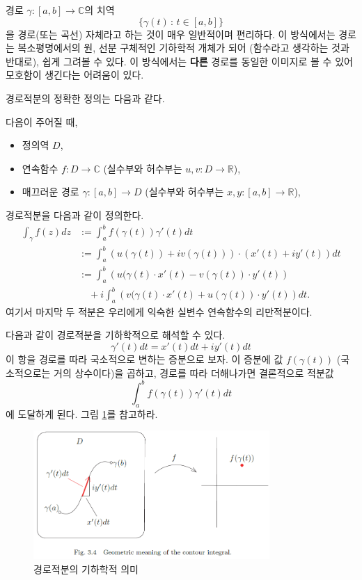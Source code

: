 \begin{salt_remark} \label{remark-3-1}
경로 $\gamma: [a,b]\to \mathbb C$의 치역
\[
\{\gamma(t) \,:\, t\in[a,b] \}
\]
을 경로(또는 곡선) 자체라고 하는 것이 매우 일반적이며 편리하다. 
이 방식에서는 경로는 
복소평명에서의 원, 선분 구체적인 기하학적 개체가 되어 (함수라고 생각하는 것과 반대로),
쉽게 그려볼 수 있다.
이 방식에서는 {\bf 다른} 경로를 동일한 이미지로 볼 수 있어
모호함이 생긴다는 어려움이 있다.
\end{salt_remark}

경로적분의 정확한 정의는 다음과 같다.

\begin{saltdefinition} {}{} \label{def-3-1}
다음이 주어질 때,
\begin{itemize}
\item[(1)] 정의역 $D$,
\item[(2)] 연속함수  $f:D\to\mathbb C$ (실수부와 허수부는 
$u,v: D\to\mathbb R$),
\item[(3)] 매끄러운 경로 $\gamma : [a,b]\to D$
(실수부와 허수부는 $x,y: [a,b] \to \mathbb R$),
\end{itemize}
경로적분을 다음과 같이 정의한다.
\begin{align} \label{eq-3-2}
\int_\gamma f(z)dz
&:= \int_a^b f(\gamma(t))\gamma'(t)dt \\
&:= \int_a^b \left( u(\gamma(t)) + iv(\gamma(t)) \right) \cdot
(x'(t) + iy'(t))dt \nonumber \\
&:= \int_a^b \left( u(\gamma(t)\cdot x'(t) - v(\gamma(t))\cdot y'(t) \right) \nonumber \\
&\quad +i \int_a^b \left(v(\gamma(t)\cdot x'(t) + u(\gamma(t))\cdot y'(t) \right) dt \nonumber.
\end{align}
여기서 마지막 두 적분은 우리에게 익숙한 실변수 연속함수의 리만적분이다.
\end{saltdefinition}

다음과 같이 경로적분을 기하학적으로 해석할 수 있다.
\[
\gamma'(t) dt = x'(t)dt + iy'(t)dt
\]
이 항을 경로를 따라 국소적으로 변하는 증분으로 보자.
이 증분에 값 $f(\gamma(t))$ (국소적으로는 거의 상수이다)을 곱하고,
경로를 따라 더해나가면 결론적으로 적분값
\[
\int_a^b f(\gamma(t))\gamma'(t)dt
\]
에 도달하게 된다. 그림 \ref{fig-3-4}를 참고하라.

\begin{figure}[!h]
\begin{center}
\includegraphics[width=0.8\textwidth]{./SaltChapter/fig-3-4}
\end{center}
\caption{경로적분의 기하학적 의미}
\label{fig-3-4}
\end{figure}

